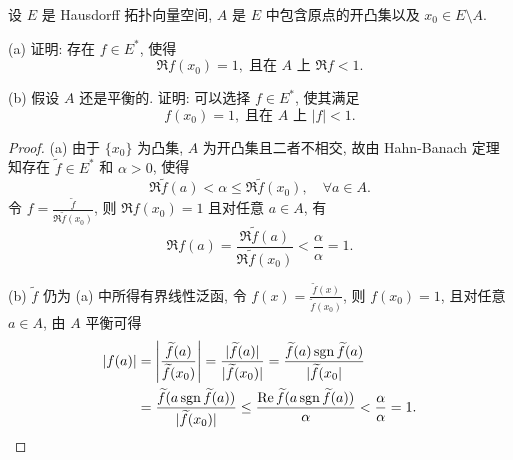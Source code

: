 






\begin{exercise}[4]
    设 $E$ 是 Hausdorff 拓扑向量空间, $A$ 是 $E$ 中包含原点的开凸集以及 $x_0\in E\setminus A$.

    (a) 证明: 存在 $f\in E^*$, 使得
    \[\Re f(x_0)=1,\;\text{且在\ }A\text{\ 上\ }\Re f<1.\]

    (b) 假设 $A$ 还是平衡的. 证明: 可以选择 $f\in E^*$, 使其满足
    \[f(x_0)=1,\;\text{且在\ }A\text{\ 上\ }|f|<1.\]
\end{exercise}

\begin{proof}
    (a) 由于 $\{x_0\}$ 为凸集, $A$ 为开凸集且二者不相交, 故由 Hahn-Banach 定理知存在
    $\widetilde{f}\in E^*$ 和 $\alpha>0$, 使得
    \[\Re\widetilde{f}(a)<\alpha\leq\Re\widetilde{f}(x_0),\quad\forall a\in A.\]
    令 $f=\frac{\widetilde{f}}{\Re\widetilde{f}(x_0)}$, 则 $\Re f(x_0)=1$ 且对任意 $a\in A$, 有
    \[\Re f(a)=\frac{\Re\widetilde{f}(a)}{\Re\widetilde{f}(x_0)}<\frac{\alpha}{\alpha}=1.\]

    (b) $\widetilde{f}$ 仍为 (a) 中所得有界线性泛函, 令 $f(x)=\frac{\widetilde{f}(x)}{\widetilde{f}(x_0)}$, 则
    $f(x_0)=1$, 且对任意 $a\in A$, 由 $A$ 平衡可得
    \begin{align*}
        |f(a)|
        & =\left|\frac{\widetilde{f}(a)}{\widetilde{f}(x_0)}\right|=\frac{|\widetilde{f}(a)|}{|\widetilde{f}(x_0)|}=\frac{\widetilde{f}(a)\operatorname{sgn}\widetilde{f}(a)}{|\widetilde{f}(x_0|} \\
        & =\frac{\widetilde{f}(a\operatorname{sgn}\widetilde{f}(a))}{|\widetilde{f}(x_0)|}\leq\frac{\operatorname{Re}\widetilde{f}(a\operatorname{sgn}\widetilde{f}(a))}{\alpha}<\frac{\alpha}{\alpha}=1.\qedhere
    \end{align*}
\end{proof}



